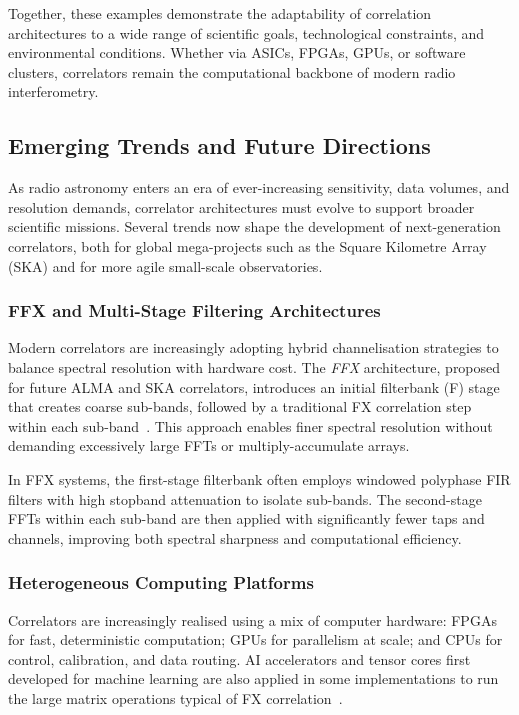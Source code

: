     Together, these examples demonstrate the adaptability of correlation architectures to a wide range of scientific goals, technological constraints, and environmental conditions. Whether via ASICs, FPGAs, GPUs, or software clusters, correlators remain the computational backbone of modern radio interferometry.

    \subsection{Emerging Trends and Future Directions}
    As radio astronomy enters an era of ever-increasing sensitivity, data volumes, and resolution demands, correlator architectures must evolve to support broader scientific missions. Several trends now shape the development of next-generation correlators, both for global mega-projects such as the Square Kilometre Array (SKA) and for more agile small-scale observatories.

        \subsubsection{FFX and Multi-Stage Filtering Architectures}
        Modern correlators are increasingly adopting hybrid channelisation strategies to balance spectral resolution with hardware cost. The \textit{FFX} architecture, proposed for future ALMA and SKA correlators, introduces an initial filterbank (F) stage that creates coarse sub-bands, followed by a traditional FX correlation step within each sub-band~\cite{Escoffier2007}. This approach enables finer spectral resolution without demanding excessively large FFTs or multiply-accumulate arrays.

        In FFX systems, the first-stage filterbank often employs windowed polyphase FIR filters with high stopband attenuation to isolate sub-bands. The second-stage FFTs within each sub-band are then applied with significantly fewer taps and channels, improving both spectral sharpness and computational efficiency.

        \subsubsection{Heterogeneous Computing Platforms}
        Correlators are increasingly realised using a mix of computer hardware: FPGAs for fast, deterministic computation; GPUs for parallelism at scale; and CPUs for control, calibration, and data routing. AI accelerators and tensor cores first developed for machine learning are also applied in some implementations to run the large matrix operations typical of FX correlation~\cite{Romein2021}.

